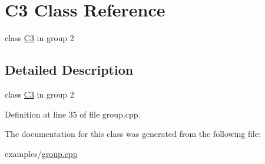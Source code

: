 \hypertarget{class_c3}{}\section{C3 Class Reference}
\label{class_c3}


class \hyperlink{class_c3}{C3} in group 2  




\subsection{Detailed Description}
class \hyperlink{class_c3}{C3} in group 2 

Definition at line 35 of file group.\+cpp.



The documentation for this class was generated from the following file\+:\begin{DoxyCompactItemize}
\item 
examples/\hyperlink{group_8cpp}{group.\+cpp}\end{DoxyCompactItemize}

